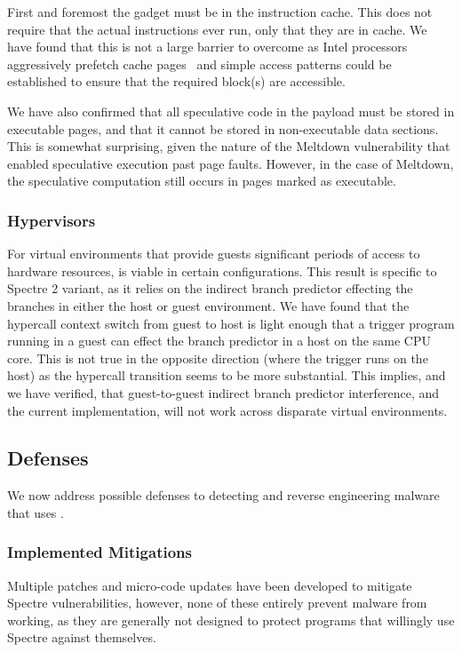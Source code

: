 First and foremost the gadget must be in the instruction cache. 
This does not require that the actual instructions ever run,
 only that they are in cache. We have 
found that this is not a large barrier to overcome as Intel 
processors aggressively prefetch cache pages~\cite{measuring-cache}
and simple access patterns could be established to ensure
that the required block(s) are accessible. 

We have also confirmed that all speculative code in the payload must be
stored in executable pages, and that it cannot be stored in non-executable data
sections. This is somewhat surprising, given the nature of the Meltdown
vulnerability that enabled speculative execution past page faults. However, in
the case of Meltdown, the speculative computation still occurs in pages marked
as executable.
\fi




\subsubsection{Hypervisors}
For virtual environments that provide guests significant periods of access to
hardware resources, \speculake is viable in certain configurations. 
This result is specific to Spectre 2 variant, as it relies on 
the indirect branch predictor effecting the branches in either the host 
or guest environment. We have found that the hypercall context switch from 
guest to host is light enough that a trigger program running in a guest
can effect the branch predictor in a host on the same CPU core. This is not
true in the opposite direction (where the trigger runs on the host) as the 
hypercall transition seems to be more substantial. This implies, and we have verified,
that guest-to-guest indirect branch predictor interference, and the current
\speculake implementation, will not work across disparate virtual environments.

\subsection{Defenses}
We now address possible defenses to detecting and reverse engineering malware that uses
\speculake. 
\subsubsection{Implemented Mitigations}
Multiple patches and micro-code updates have been developed to mitigate Spectre
vulnerabilities, however, none of these entirely prevent \speculake malware from
working, as they are generally not designed to protect programs that willingly use
Spectre against themselves.

